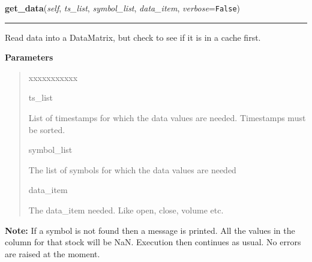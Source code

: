    \vspace{0.5ex}

\hspace{.8\funcindent}\begin{boxedminipage}{\funcwidth}

    \raggedright \textbf{get\_data}(\textit{self}, \textit{ts\_list}, \textit{symbol\_list}, \textit{data\_item}, \textit{verbose}={\tt False})

    \vspace{-1.5ex}

    \rule{\textwidth}{0.5\fboxrule}
\setlength{\parskip}{2ex}
    Read data into a DataMatrix, but check to see if it is in a cache 
    first.

\setlength{\parskip}{1ex}
      \textbf{Parameters}
      \vspace{-1ex}

      \begin{quote}
        \begin{Ventry}{xxxxxxxxxxx}

          \item[ts\_list]

          List of timestamps for which the data values are needed. 
          Timestamps must be sorted.

          \item[symbol\_list]

          The list of symbols for which the data values are needed

          \item[data\_item]

          The data\_item needed. Like open, close, volume etc.

        \end{Ventry}

      \end{quote}

\textbf{Note:} If a symbol is not found then a message is printed. All the values in the 
column for that stock will be NaN. Execution then continues as usual. No 
errors are raised at the moment.



    \end{boxedminipage}

    \label{trunk:qstkutil:DataAccess:DataAccess:getPathOfFile}

